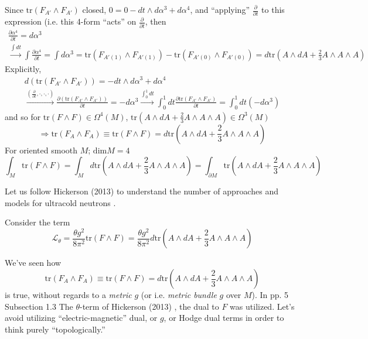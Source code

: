 \documentclass[10pt]{amsart}
\begin{document}
Since $\text{tr}(F_{A'} \wedge F_{A'})$ closed, $0 = 0 - dt \wedge d\alpha^3 + d\alpha^4$, and ``applying'' $\frac{ \partial }{ \partial t}$ to this expression (i.e. this 4-form ``acts'' on $\frac{ \partial }{ \partial t}$, then 
\[
\begin{gathered}
  \frac{ \partial \alpha^4}{ \partial t} = d\alpha^3 \\ 
\xrightarrow{ \int dt } \int \frac{ \partial \alpha^4}{ \partial t} = \int d\alpha^3 = \text{tr}(F_{A'(1)} \wedge F_{A'(1)} ) - \text{tr}(F_{A'(0)} \wedge F_{A'(0) } ) = d\text{tr}(A\wedge dA + \frac{2}{3} A \wedge A \wedge A)
\end{gathered}
\]
Explicitly,
\[
\begin{gathered}
  d(\text{tr}(F_{A'} \wedge F_{A'}) ) = -dt \wedge d\alpha^3 + d\alpha^4 \\ 
  \xrightarrow{ \left( \frac{ \partial }{ \partial t} , \cdot, \cdot, \cdot \right) } \frac{ \partial ( \text{tr}(F_{A'} \wedge F_{A'} ) ) }{ \partial t} = - d\alpha^3 \xrightarrow{ \int_0^1 dt } \int_0^1 dt \frac{ \partial \text{tr}( F_{A'} \wedge F_{A'})}{ \partial t} = \int_0^1 dt ( -d\alpha^3)
\end{gathered}
\]
and so for $\text{tr}(F\wedge F) \in \Omega^4(M)$, $\text{tr}(A \wedge dA + \frac{2}{3} A \wedge A \wedge A) \in \Omega^3(M)$
\[
\Longrightarrow \text{tr}(F_A \wedge F_A) \equiv \text{tr}(F\wedge F) = d\text{tr}(A \wedge dA + \frac{2}{3} A \wedge A \wedge A )
\]
For oriented smooth $M$; $\text{dim}M=4$
\[
\int_M \text{tr}(F\wedge F)= \int_M d\text{tr}(A \wedge dA + \frac{2}{3} A \wedge A \wedge A ) = \int_{\partial M} \text{tr}(A \wedge dA + \frac{2}{3} A \wedge A \wedge A)
\]



Let us follow Hickerson (2013) \cite{Hick2013} to understand the number of approaches and models for ultracold neutrons \cite{Hick2013}.  

Consider the term
\[
\mathcal{L}_{\theta} = \frac{ \theta g^2}{ 8 \pi^2 } \text{tr}(F\wedge F) = \frac{ \theta g^2}{8 \pi^2} d\text{tr}( A \wedge dA + \frac{2}{3} A \wedge A \wedge A)
\]

We've seen how 
\begin{equation}
  \text{tr}(F_A \wedge F_A) \equiv \text{tr}(F\wedge F) = d\text{tr}(A \wedge dA + \frac{2}{3} A \wedge A \wedge A )
\end{equation}
is true, without regards to a \emph{metric} $g$ (or i.e. \emph{metric bundle} $g$ over $M$).  In pp. 5 Subsection 1.3 The $\theta$-term of Hickerson (2013) \cite{Hick2013}, the dual to $F$ was utilized.  Let's avoid utilizing ``electric-magnetic'' dual, or $g$, or Hodge dual terms in order to think purely ``topologically.''
\end{document}
